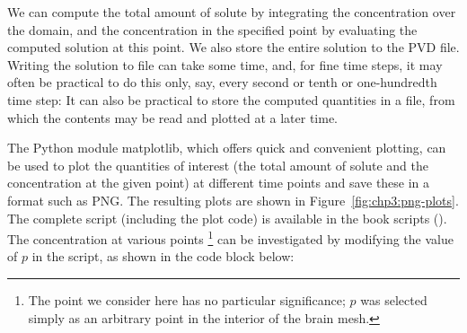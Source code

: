 We can compute the total amount of solute by integrating the
concentration over the domain, and the concentration in the specified
point by evaluating the computed solution at this point. We also store
the entire solution to the PVD file. Writing the solution to file can
take some time, and, for fine time steps, it may often be practical to
do this only, say, every second or tenth or one-hundredth time step:
 It can also be practical
to store the computed quantities in a file, from which the contents
may be read and plotted at a later time.

%
The Python module matplotlib, which offers quick and convenient
plotting, can be used to plot the quantities of interest (the total
amount of solute and the concentration at the given point) at
different time points and save these in a format such as PNG. The
resulting plots are shown in Figure~\ref{fig:chp3:png-plots}. The
complete script (including the plot code) is available in the book
scripts (). The concentration at
various points \footnote{The point we consider here has no particular
  significance; $p$ was selected simply as an arbitrary point in the
  interior of the brain mesh.} can be investigated by modifying the
value of $p$ in the script, as shown in the code block below:

